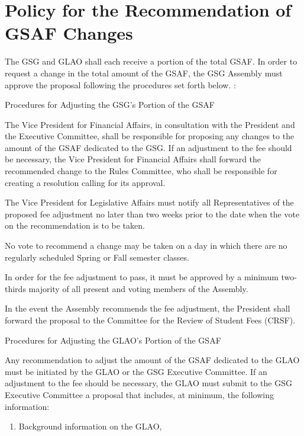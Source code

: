 \section{Policy for the Recommendation of GSAF Changes}
The GSG and GLAO shall each receive a portion of the total GSAF. In order to request a change in the total amount of the GSAF, the GSG Assembly must approve the proposal following the procedures set forth below. :
\begin{bylaws-number}
  \item Procedures for Adjusting the GSG’s Portion of the GSAF
\begin{bylaws-number}
  \item The Vice President for Financial Affairs, in consultation with the President and the Executive Committee, shall be responsible for proposing any changes to the amount of the GSAF dedicated to the GSG. If an adjustment to the fee should be necessary, the Vice President for Financial Affairs shall forward the recommended change to the Rules Committee, who shall be responsible for creating a resolution calling for its approval.
  \item The Vice President for Legislative Affairs must notify all Representatives of the proposed fee adjustment no later than two weeks prior to the date when the vote on the recommendation is to be taken.
  \item No vote to recommend a change may be taken on a day in which there are no regularly scheduled Spring or Fall semester classes.
  \item In order for the fee adjustment to pass, it must be approved by a minimum two-thirds majority of all present and voting members of the Assembly.
  \item In the event the Assembly recommends the fee adjustment, the President shall forward the proposal to the Committee for the Review of Student Fees (CRSF).
\end{bylaws-number}
  \item Procedures for Adjusting the GLAO’s Portion of the GSAF
\begin{bylaws-number}
  \item Any recommendation to adjust the amount of the GSAF dedicated to the GLAO must be initiated by the GLAO or the GSG Executive Committee. If an adjustment to the fee should be necessary, the GLAO must submit to the GSG Executive Committee a proposal that includes, at minimum, the following information:
\begin{enumerate}[i]
  \item Background information on the GLAO,

\end{enumerate}
\end{bylaws-number}
\end{bylaws-number}
